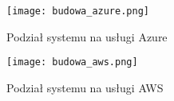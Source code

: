 \begin{figure}[H]
	\centering
	\texttt{[image: budowa\_azure.png]}
	\caption{Podział systemu na usługi Azure}
	\label{fig:schemat_azure}
\end{figure}

\begin{figure}[H]
	\centering
	\texttt{[image: budowa\_aws.png]}
	\caption{Podział systemu na usługi AWS}
	\label{fig:schemat_aws}
\end{figure}

